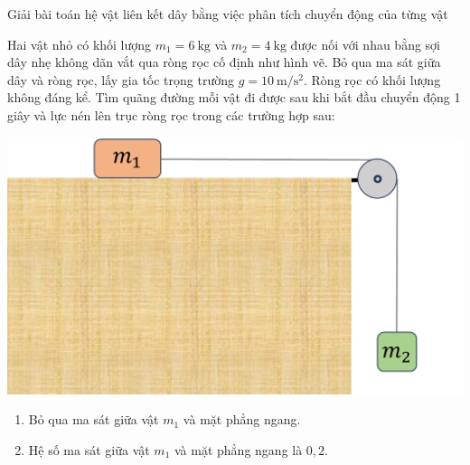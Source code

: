 \begin{dang}{Giải bài toán hệ vật liên kết dây bằng việc phân tích chuyển động của từng vật}
{Hai vật nhỏ có khối lượng $m_1=\SI{6}{\kilogram}$ và $m_2=\SI{4}{\kilogram}$ được nối với nhau bằng sợi dây nhẹ không dãn vắt qua ròng rọc cố định như hình vẽ. Bỏ qua ma sát giữa dây và ròng rọc, lấy gia tốc trọng trường $g=\SI{10}{\meter/\second^2}$. Ròng rọc có khối lượng không đáng kể. Tìm quãng đường mỗi vật đi được sau khi bắt đầu chuyển động 1 giây và lực nén lên trục ròng rọc trong các trường hợp sau:
	\begin{center}
		\includegraphics[width=0.4\linewidth]{../figs/VN10-2023-PH-TP021-1}
	\end{center}
	\begin{enumerate}[label=\alph*)]
		\item Bỏ qua ma sát giữa vật $m_1$ và mặt phẳng ngang.
		\item Hệ số ma sát giữa vật $m_1$ và mặt phẳng ngang là $0,2$.
	\end{enumerate}
}
{}
\end{dang}
